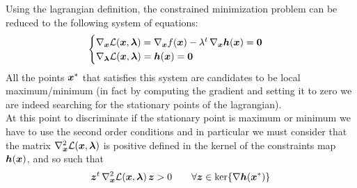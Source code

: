 	Using the lagrangian definition, the constrained minimization problem can be reduced to the following system of equations:
	\begin{equation}
	\begin{cases}		
		\nabla_{\boldsymbol{x}} \mathcal L(\boldsymbol{x},\boldsymbol{\lambda}) = \nabla_{\boldsymbol{x}} f(\boldsymbol{x}) - \lambda^t\, \nabla_{\boldsymbol{x}} \boldsymbol{h}(\boldsymbol{x}) = \boldsymbol{0} \\
		\nabla_{\boldsymbol{\lambda}} \mathcal L(\boldsymbol{x}, \boldsymbol{\lambda}) = \boldsymbol{h}(\boldsymbol{x}) = \boldsymbol{0}
	\end{cases}
	\end{equation}
	All the points $\boldsymbol{x}^*$ that satisfies this system are candidates to be local maximum/minimum (in fact by computing the gradient and setting it to zero we are indeed searching for the stationary points of the lagrangian).\\
	At this point to discriminate if the stationary point is maximum or minimum we have to use the second order conditions and in particular we must consider that the matrix $\nabla_{\boldsymbol{x}}^2 \mathcal L(\boldsymbol{x},\boldsymbol{\lambda})$ is positive defined in the kernel of the constraints map $\boldsymbol{h}(\boldsymbol{x})$, and so such that
	\begin{equation}
		\boldsymbol{z}^t \, \nabla_{\boldsymbol{x}}^2\mathcal L(\boldsymbol{x},\boldsymbol{\lambda})\, \boldsymbol{z} > 0 \qquad \forall \boldsymbol{z} \in \ker\{ \nabla\boldsymbol{h}(\boldsymbol{x}^*) \}
	\end{equation}

